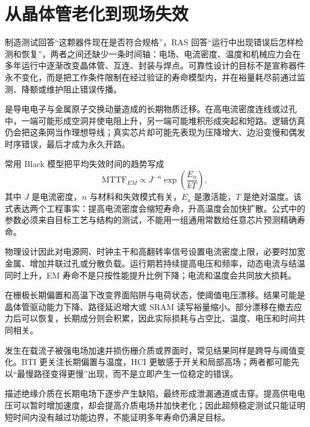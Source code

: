 \section{从晶体管老化到现场失效}

制造测试回答“这颗器件现在是否符合规格”，RAS 回答“运行中出现错误后怎样检测和恢复”，两者之间还缺少一条时间轴：电场、电流密度、温度和机械应力会在多年运行中逐渐改变晶体管、互连、封装与焊点。可靠性设计的目标不是宣称器件永不变化，而是把工作条件限制在经过验证的寿命模型内，并在裕量耗尽前通过监测、降额或维护阻止错误传播。\cite{nasa-pof-reliability}


是导电电子与金属原子交换动量造成的长期物质迁移。在高电流密度连线或过孔中，一端可能形成空洞并使电阻上升，另一端可能堆积形成突起和短路。逻辑仿真仍会把这条网当作理想导线；真实芯片却可能先表现为压降增大、边沿变慢和偶发时序错误，最后才成为永久开路。

常用 Black 模型把平均失效时间的趋势写成
\[
  \mathrm{MTTF}_{EM} \propto J^{-n}
  \exp\left(\frac{E_a}{kT}\right),
\]
其中 $J$ 是电流密度，$n$ 与材料和失效模式有关，$E_a$ 是激活能，$T$ 是绝对温度。该式表达两个工程事实：提高电流密度会缩短寿命，升高温度会加快扩散。公式中的参数必须来自目标工艺与结构的测试，不能用一组通用常数给任意芯片预测精确寿命。

物理设计因此对电源网、时钟主干和高翻转率信号设置电流密度上限，必要时加宽金属、增加并联过孔或分散负载。运行期若持续提高电压和频率，动态电流与结温同时上升，EM 寿命不是只按性能提升比例下降；电流和温度会共同放大损耗。


在栅极长期偏置和高温下改变界面陷阱与电荷状态，使阈值电压漂移。结果可能是晶体管驱动能力下降、路径延迟增大或 SRAM 读写裕量缩小。部分漂移在撤去应力后可以恢复，长期成分则会积累，因此实际损耗与占空比、温度、电压和时间共同相关。

发生在载流子被强电场加速并损伤栅介质或界面时，常见结果同样是跨导与阈值变化。BTI 更关注长期偏置与温度，HCI 更敏感于开关和局部高场；两者都可能先以“最慢路径变得更慢”出现，而不是立即产生一位稳定的错误。

描述绝缘介质在长期电场下逐步产生缺陷，最终形成泄漏通道或击穿。提高供电电压可以暂时增加速度，却会提高介质电场并加快老化；因此超频稳定测试只能证明短时间内没有越过功能边界，不能证明多年寿命仍满足目标。

